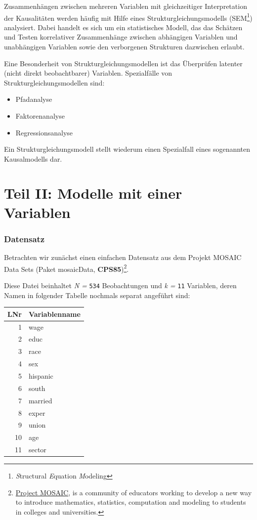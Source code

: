 \documentclass[]{article}
\providecommand{\tightlist}{%
  \setlength{\itemsep}{0pt}\setlength{\parskip}{0pt}}
\let\rmarkdownfootnote\footnote%
\def\footnote{\protect\rmarkdownfootnote}
\begin{document}
Zusammenhängen zwischen mehreren Variablen mit gleichzeitiger
Interpretation der Kausalitäten werden häufig mit Hilfe eines
Strukturgleichungsmodells (SEM\footnote{\emph{S}tructural
  \emph{E}quation \emph{M}odeling}) analysiert. Dabei handelt es sich um
ein statistisches Modell, das das Schätzen und Testen korrelativer
Zusammenhänge zwischen abhängigen Variablen und unabhängigen Variablen
sowie den verborgenen Strukturen dazwischen erlaubt.

Eine Besonderheit von Strukturgleichungsmodellen ist das Überprüfen
latenter (nicht direkt beobachtbarer) Variablen. Spezialfälle von
Strukturgleichungsmodellen sind:

\begin{itemize}
\tightlist
\item
  Pfadanalyse
\item
  Faktorenanalyse
\item
  Regressionsanalyse
\end{itemize}

Ein Strukturgleichungsmodell stellt wiederum einen Spezialfall eines
sogenannten Kausalmodells dar.

\part*{Teil II: Modelle mit einer
Variablen}\label{part-teil-ii-modelle-mit-einer-variablen}

\section*{Datensatz}\label{datensatz}

Betrachten wir zunächst einen einfachen Datensatz aus dem Projekt MOSAIC
Data Sets (Paket mosaicData, \textbf{CPS85})\footnote{\href{http://mosaic-web.org/}{Project
  MOSAIC}, is a community of educators working to develop a new way to
  introduce mathematics, statistics, computation and modeling to
  students in colleges and universities.}.

Diese Datei beinhaltet \emph{N =} \texttt{534} Beobachtungen und \emph{k
=} \texttt{11} Variablen, deren Namen in folgender Tabelle nochmals
separat angeführt sind:

\begin{tabular}{r|l}
\hline
LNr & Variablenname\\
\hline
1 & wage\\
\hline
2 & educ\\
\hline
3 & race\\
\hline
4 & sex\\
\hline
5 & hispanic\\
\hline
6 & south\\
\hline
7 & married\\
\hline
8 & exper\\
\hline
9 & union\\
\hline
10 & age\\
\hline
11 & sector\\
\hline
\end{tabular}
\end{document}
